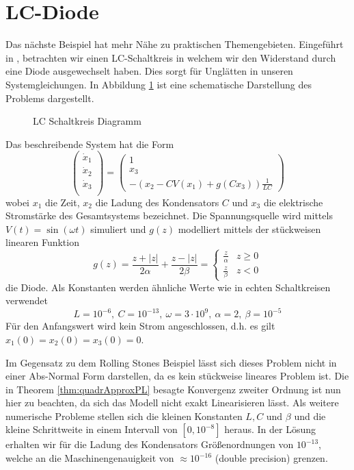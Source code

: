 \section{LC-Diode}
Das nächste Beispiel hat mehr Nähe zu praktischen Themengebieten. Eingeführt in \cite{boeck2014experiments}, betrachten wir einen LC-Schaltkreis in welchem wir den Widerstand durch eine Diode ausgewechselt haben. Dies sorgt für Unglätten in unseren Systemgleichungen. In Abbildung \ref{fig:lcDiode} ist eine schematische Darstellung des Problems dargestellt. 
\begin{figure}[H]
\centering

\caption{LC Schaltkreis Diagramm}
\label{fig:lcDiode}
\end{figure}
Das beschreibende System hat die Form
\[
 \begin{pmatrix}
  \dot x_1\\
  \dot x_2\\
  \dot x_3\\
 \end{pmatrix}
 = 
 \begin{pmatrix}
  1\\
  x_3\\
  -\left(x_2-CV(x_1) + g(Cx_3)\right)\frac{1}{LC}
 \end{pmatrix}
\]
wobei $x_1$ die Zeit, $x_2$ die Ladung des Kondensators $C$ und $x_3$ die elektrische Stromstärke des Gesamtsystems bezeichnet. Die Spannungsquelle wird mittels $V(t)=\sin(\omega t)$ simuliert und $g(z)$ modelliert mittels der stückweisen linearen Funktion 
\begin{equation}
 g(z) = \frac{z+|z|}{2\alpha} + \frac{z-|z|}{2\beta}  = \begin{cases}
                                                         \frac{z}{\alpha} & z\geq 0\\
                                                         \frac{z}{\beta}  & z<0
                                                        \end{cases}
\label{eq:lcOde}                                                       
\end{equation}
die Diode. Als Konstanten werden ähnliche Werte wie in echten Schaltkreisen verwendet
\[
 L= 10^{-6},~ C=10^{-13},~ \omega = 3\cdot 10^{9},~\alpha = 2,~\beta = 10^{-5}
\]
Für den Anfangswert wird kein Strom angeschlossen, d.h. es gilt $x_1(0)  = x_2(0) = x_3(0) = 0$.

Im Gegensatz zu dem Rolling Stones Beispiel lässt sich dieses Problem nicht in einer Abs-Normal Form darstellen, da es kein stückweise lineares Problem ist. Die in Theorem \ref{thm:quadrApproxPL} besagte Konvergenz zweiter Ordnung ist nun hier zu beachten, da sich das Modell nicht exakt Linearisieren lässt. Als weitere numerische Probleme stellen sich die kleinen Konstanten $L,C$ und $\beta$ und die kleine Schrittweite in einem Intervall von $[0, 10^{-8}]$ heraus. In der Lösung erhalten wir für die Ladung des Kondensators Größenordnungen von $10^{-13}$, welche an die Maschinengenauigkeit von $\approx 10^{-16}$ (double precision) grenzen.

